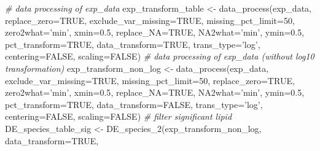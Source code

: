 \documentclass[]{article}
\newcommand{\hlnum}[1]{\textcolor[rgb]{0.816,0.125,0.439}{#1}}%
\newcommand{\hlstr}[1]{\textcolor[rgb]{0.251,0.627,0.251}{#1}}%
\newcommand{\hlcom}[1]{\textcolor[rgb]{0.502,0.502,0.502}{\textit{#1}}}%
\newcommand{\hlstd}[1]{\textcolor[rgb]{0.251,0.251,0.251}{#1}}%
\newcommand{\hlkwc}[1]{\textcolor[rgb]{0.251,0.251,0.251}{#1}}%
\newcommand{\hlkwd}[1]{\textcolor[rgb]{0.878,0.439,0.125}{#1}}%
\newenvironment{Shaded}{\begin{myshaded}}{\end{myshaded}}
\newcommand{\KeywordTok}[1]{\hlkwd{#1}}
\newcommand{\DataTypeTok}[1]{\hlkwc{#1}}
\newcommand{\DecValTok}[1]{\hlnum{#1}}
\newcommand{\FloatTok}[1]{\hlnum{#1}}
\newcommand{\StringTok}[1]{\hlstr{#1}}
\newcommand{\CommentTok}[1]{\hlcom{#1}}
\newcommand{\OtherTok}[1]{{#1}}
\newcommand{\NormalTok}[1]{\hlstd{#1}}
\begin{document}
\begin{Shaded}
\begin{Highlighting}[]
\CommentTok{# data processing of exp_data}
\NormalTok{exp_transform_table <-}\StringTok{ }\KeywordTok{data_process}\NormalTok{(exp_data, }\DataTypeTok{replace_zero=}\OtherTok{TRUE}\NormalTok{,}
                                    \DataTypeTok{exclude_var_missing=}\OtherTok{TRUE}\NormalTok{,}
                                    \DataTypeTok{missing_pct_limit=}\DecValTok{50}\NormalTok{,}
                                    \DataTypeTok{zero2what=}\StringTok{'min'}\NormalTok{,}
                                    \DataTypeTok{xmin=}\FloatTok{0.5}\NormalTok{, }\DataTypeTok{replace_NA=}\OtherTok{TRUE}\NormalTok{,}
                                    \DataTypeTok{NA2what=}\StringTok{'min'}\NormalTok{, }\DataTypeTok{ymin=}\FloatTok{0.5}\NormalTok{,}
                                    \DataTypeTok{pct_transform=}\OtherTok{TRUE}\NormalTok{, }\DataTypeTok{data_transform=}\OtherTok{TRUE}\NormalTok{,}
                                    \DataTypeTok{trans_type=}\StringTok{'log'}\NormalTok{, }\DataTypeTok{centering=}\OtherTok{FALSE}\NormalTok{, }
                                    \DataTypeTok{scaling=}\OtherTok{FALSE}\NormalTok{)}
\CommentTok{# data processing of exp_data (without log10 transformation)}
\NormalTok{exp_transform_non_log <-}\StringTok{ }\KeywordTok{data_process}\NormalTok{(exp_data, }\DataTypeTok{exclude_var_missing=}\OtherTok{TRUE}\NormalTok{,}
                                      \DataTypeTok{missing_pct_limit=}\DecValTok{50}\NormalTok{, }\DataTypeTok{replace_zero=}\OtherTok{TRUE}\NormalTok{,}
                                      \DataTypeTok{zero2what=}\StringTok{'min'}\NormalTok{, }\DataTypeTok{xmin=}\FloatTok{0.5}\NormalTok{,}
                                      \DataTypeTok{replace_NA=}\OtherTok{TRUE}\NormalTok{, }\DataTypeTok{NA2what=}\StringTok{'min'}\NormalTok{,}
                                      \DataTypeTok{ymin=}\FloatTok{0.5}\NormalTok{, }\DataTypeTok{pct_transform=}\OtherTok{TRUE}\NormalTok{,}
                                      \DataTypeTok{data_transform=}\OtherTok{FALSE}\NormalTok{, }\DataTypeTok{trans_type=}\StringTok{'log'}\NormalTok{,}
                                      \DataTypeTok{centering=}\OtherTok{FALSE}\NormalTok{, }\DataTypeTok{scaling=}\OtherTok{FALSE}\NormalTok{)}
\CommentTok{# filter significant lipid}
\NormalTok{DE_species_table_sig <-}\StringTok{ }\KeywordTok{DE_species_2}\NormalTok{(exp_transform_non_log, }
                                     \DataTypeTok{data_transform=}\OtherTok{TRUE}\NormalTok{,}

\end{Highlighting}
\end{Shaded}
\end{document}
